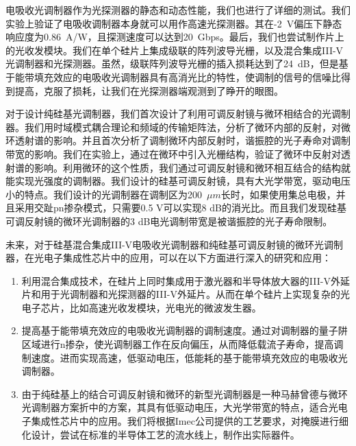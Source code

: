 电吸收光调制器作为光探测器的静态和动态性能，我们也进行了详细的测试。我们实验上验证了电吸收调制器本身就可以用作高速光探测器。其在-2~V偏压下静态响应度为0.86~A/W，且探测速度可以达到20~Gbps。最后，我们也尝试制作片上的光收发模块。我们在单个硅片上集成级联的阵列波导光栅，以及混合集成III-V光调制器和光探测器。虽然，级联阵列波导光栅的插入损耗达到了24~dB，但是基于能带填充效应的电吸收光调制器具有高消光比的特性，使调制的信号的信噪比得到提高，克服了损耗，让我们在光探测器端观测到了睁开的眼图。

对于设计纯硅基光调制器，我们首次设计了利用可调反射镜与微环相结合的光调制器。我们用时域模式耦合理论和频域的传输矩阵法，分析了微环内部的反射，对微环透射谱的影响。并且首次分析了调制微环内部反射时，谐振腔的光子寿命对调制带宽的影响。我们在实验上，通过在微环中引入光栅结构，验证了微环中反射对透射谱的影响。利用微环的这个性质，我们通过可调反射镜和微环相互结合的结构就能实现光强度的调制器。我们设计的硅基可调反射镜，具有大光学带宽，驱动电压小的特点。我们设计的光调制器在调制区为200~$\mu m$长时，如果使用集总电极，并且采用交趾pn掺杂模式，只需要0.5 V可以实现8 dB的消光比。而且我们发现硅基可调反射镜的微环光调制器的3 dB电光调制带宽是被谐振腔的光子寿命限制。

未来，对于硅基混合集成III-V电吸收光调制器和纯硅基可调反射镜的微环光调制器，在光电子集成性芯片中的应用，可以在以下方面进行深入的研究和应用：
\begin{enumerate}[(1)]
	\item 利用混合集成技术，在硅片上同时集成用于激光器和半导体放大器的III-V外延片和用于光调制器和光探测器的III-V外延片。从而在单个硅片上实现复杂的光电子芯片，比如高速光收发模块，光电光的微波发生器。
	\item 提高基于能带填充效应的电吸收光调制器的调制速度。通过对调制器的量子阱区域进行n掺杂，使光调制器工作在反向偏压，从而降低载流子寿命，提高调制速度。进而实现高速，低驱动电压，低能耗的基于能带填充效应的电吸收光调制器。
	\item 由于纯硅基上的结合可调反射镜和微环的新型光调制器是一种马赫曾德与微环光调制器方案折中的方案，其具有低驱动电压，大光学带宽的特点，适合光电子集成性芯片中的应用。我们将根据Imec公司提供的工艺要求，对掩膜进行细化设计，尝试在标准的半导体工艺的流水线上，制作出实际器件。
\end{enumerate}

